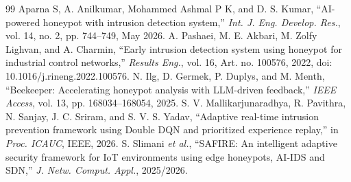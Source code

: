 \documentclass[conference]{IEEEtran}
\begin{document}
\begin{thebibliography}{99}
 Aparna S, A. Anilkumar, Mohammed Ashmal P K, and D. S. Kumar, ``AI-powered honeypot with intrusion detection system,'' \emph{Int. J. Eng. Develop. Res.}, vol. 14, no. 2, pp. 744--749, May 2026.
 A. Pashaei, M. E. Akbari, M. Zolfy Lighvan, and A. Charmin, ``Early intrusion detection system using honeypot for industrial control networks,'' \emph{Results Eng.}, vol. 16, Art. no. 100576, 2022, doi: 10.1016/j.rineng.2022.100576.
 N. Ilg, D. Germek, P. Duplys, and M. Menth, ``Beekeeper: Accelerating honeypot analysis with LLM-driven feedback,'' \emph{IEEE Access}, vol. 13, pp. 168034--168054, 2025.
 S. V. Mallikarjunaradhya, R. Pavithra, N. Sanjay, J. C. Sriram, and S. V. S. Yadav, ``Adaptive real-time intrusion prevention framework using Double DQN and prioritized experience replay,'' in \emph{Proc. ICAUC}, IEEE, 2026.
 S. Slimani \emph{et al.}, ``SAFIRE: An intelligent adaptive security framework for IoT environments using edge honeypots, AI-IDS and SDN,'' \emph{J. Netw. Comput. Appl.}, 2025/2026.
\end{thebibliography}
\end{document}
